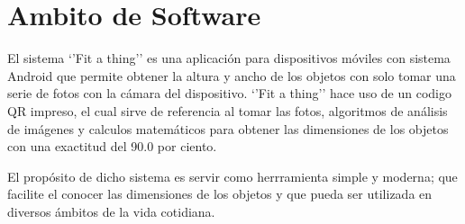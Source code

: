\section{Ambito de Software}
El sistema `'Fit a thing'' es una aplicación para dispositivos  móviles con sistema Android que permite obtener la altura y ancho de los objetos con solo tomar una serie de fotos con la cámara del dispositivo. `'Fit a thing'' hace uso de un codigo QR impreso, el cual sirve de referencia al tomar las fotos, algoritmos de análisis de imágenes y calculos matemáticos para obtener las dimensiones de los objetos con una exactitud del 90.0 por ciento.

El propósito de dicho sistema es servir como  herrramienta simple y moderna; que facilite el conocer las dimensiones de los objetos y que pueda ser utilizada en diversos ámbitos de la vida cotidiana.